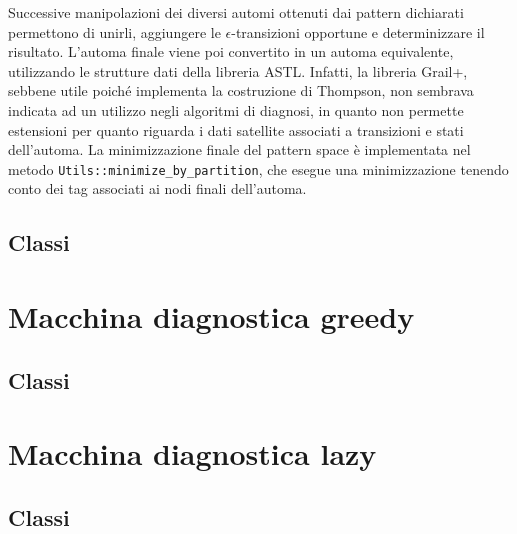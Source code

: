Successive manipolazioni dei diversi automi ottenuti dai pattern dichiarati permettono di unirli, aggiungere le $\epsilon$-transizioni opportune e determinizzare il risultato. L'automa finale viene poi convertito in un automa equivalente, utilizzando le strutture dati della libreria ASTL. Infatti, la libreria Grail+, sebbene utile poiché implementa la costruzione di Thompson, non sembrava indicata ad un utilizzo negli algoritmi di diagnosi, in quanto non permette estensioni per quanto riguarda i dati satellite associati a transizioni e stati dell'automa.
La minimizzazione finale del pattern space è implementata nel metodo \verb|Utils::minimize_by_partition|, che esegue una minimizzazione tenendo conto dei tag associati ai nodi finali dell'automa.

\subsection{Classi}


\section{Macchina diagnostica greedy}

\subsection{Classi}

\section{Macchina diagnostica lazy}

\subsection{Classi}